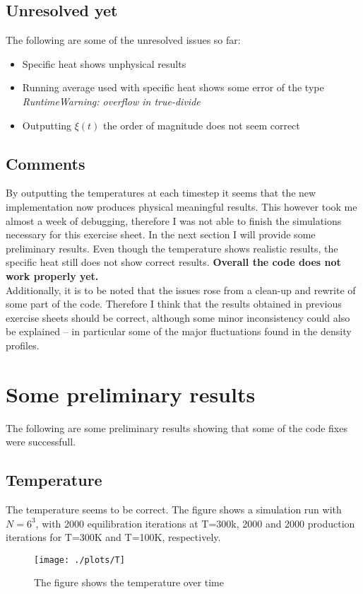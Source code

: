 \documentclass[aps,pra,reprint, onecolumn, rmp]{revtex4-2}
\begin{document}
\subsection{Unresolved yet}
The following are some of the unresolved issues so far:
\begin{itemize}
  \item Specific heat shows unphysical results 
  \item Running average used with specific heat shows some error of the type \textit{RuntimeWarning: overflow in true-divide}
  \item Outputting $\xi(t)$ the order of magnitude does not seem correct
\end{itemize}


\subsection{Comments}
By outputting the temperatures at each timestep it seems that the new implementation now produces physical meaningful results. This however took me almost a week of debugging, therefore I was not able to finish the simulations necessary for this exercise sheet. In the next section I will provide some preliminary results. Even though the temperature shows realistic results, the specific heat still does not show correct results. \textbf{Overall the code does not work properly yet.}\\

Additionally, it is to be noted that the issues rose from a clean-up and rewrite of some part of the code. Therefore I think that the results obtained in previous exercise sheets should be correct, although some minor inconsistency could also be explained -- in particular some of the major fluctuations found in the density profiles. 



\section{Some preliminary results}
The following are some preliminary results showing that some of the code fixes were successfull.

\subsection{Temperature}
The temperature seems to be correct. The figure shows a simulation run with $N=6^3$, with 2000 equilibration iterations at T=300k, 2000 and 2000 production iterations for T=300K and T=100K, respectively. 
\begin{figure}[h]
          \centering
          \texttt{[image: ./plots/T]}
          \caption{The figure shows the temperature over time}
\end{figure}
\end{document}

